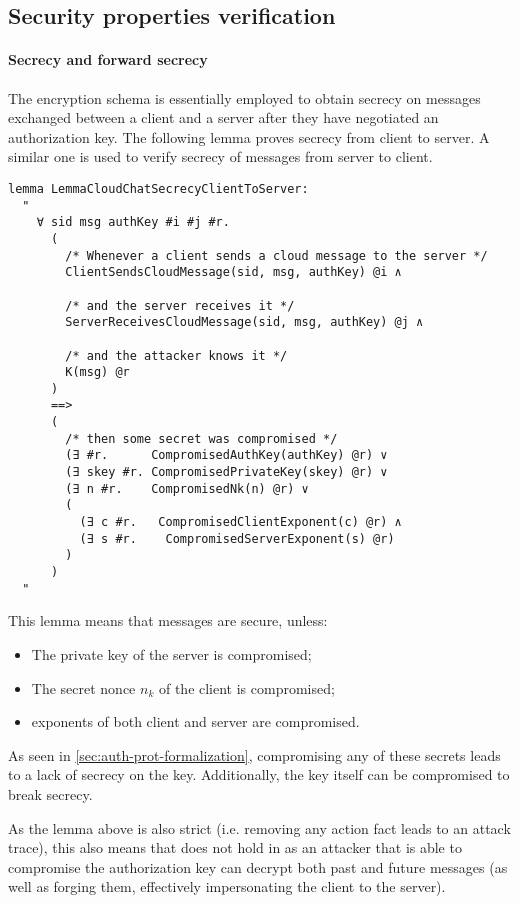 \subsection{Security properties verification}

\paragraph{Secrecy and forward secrecy} The \cchat{} encryption schema is essentially employed to obtain secrecy on messages exchanged between a client and a server after they have negotiated an authorization key.
The following lemma proves secrecy from client to server. A similar one is used to verify secrecy of messages from server to client.

\begin{lstlisting}
lemma LemmaCloudChatSecrecyClientToServer:
  "
    ∀ sid msg authKey #i #j #r.
      (
        /* Whenever a client sends a cloud message to the server */
        ClientSendsCloudMessage(sid, msg, authKey) @i ∧

        /* and the server receives it */
        ServerReceivesCloudMessage(sid, msg, authKey) @j ∧

        /* and the attacker knows it */
        K(msg) @r
      )
      ==>
      (
        /* then some secret was compromised */
        (∃ #r.      CompromisedAuthKey(authKey) @r) ∨
        (∃ skey #r. CompromisedPrivateKey(skey) @r) ∨
        (∃ n #r.    CompromisedNk(n) @r) ∨
        (
          (∃ c #r.   CompromisedClientExponent(c) @r) ∧
          (∃ s #r.    CompromisedServerExponent(s) @r)
        )
      )
  "
\end{lstlisting}

This lemma means that messages are secure, unless:
\begin{itemize}
  \item The private key of the server is compromised;
  \item The secret nonce $n_k$ of the client is compromised;
  \item \DiHe{} exponents of both client and server are compromised.
\end{itemize}

As seen in \cref{sec:auth-prot-formalization}, compromising any of these secrets leads to a lack of secrecy on the key. Additionally, the key itself can be compromised to break \cchats{} secrecy.

As the lemma above is also strict (i.e. removing any action fact leads to an attack trace), this also means that \pfs{} does not hold in \cchats{} as an attacker that is able to compromise the authorization key can decrypt both past and future messages (as well as forging them, effectively impersonating the client to the server).






